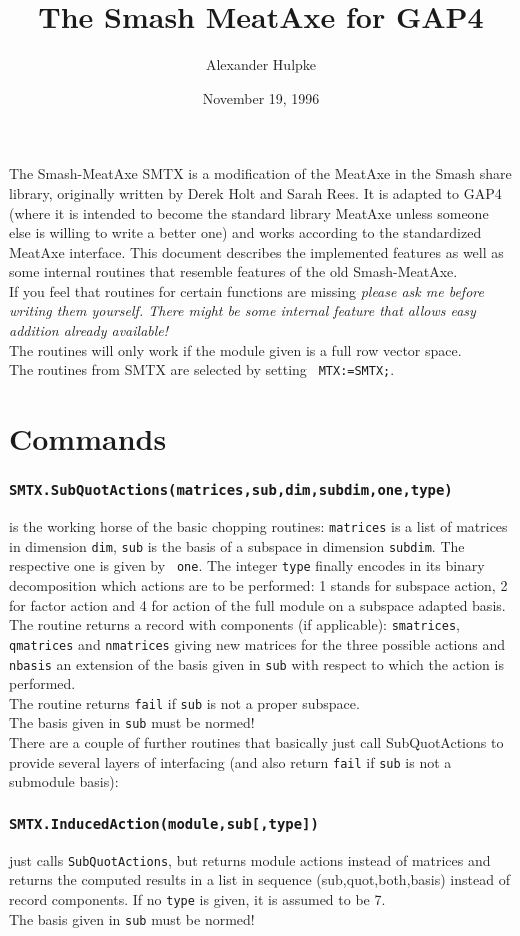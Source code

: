 \documentclass[12pt]{article}
\title{The Smash MeatAxe for {\sf GAP4}}
\author{Alexander Hulpke}
\date{November 19, 1996}
\def\smtxcmd#1{\subsubsection*{{\tt #1}}}
\def\SMTX{{\sf SMTX}}
\begin{document}
\maketitle
The {\sf Smash}-MeatAxe {\SMTX} is a modification of the MeatAxe in the {\sf
Smash} share library, originally written by Derek Holt and Sarah Rees. It is
adapted to {\sf GAP4}
(where it is intended to become the standard library MeatAxe
unless someone else is willing to write a better one) and works according to
the standardized MeatAxe interface. This document describes the implemented
features as well as some internal routines that resemble features of the
old {\sf Smash}-MeatAxe.\\
If you feel that routines for certain functions are missing {\em please ask
me before writing them yourself. There might be some internal feature that
allows easy addition already available!}\\
The routines will only work if the module given is a full row vector space.\\
The routines from {\SMTX} are selected by setting {\verb+ MTX:=SMTX;+}.

\section*{Commands}
\smtxcmd{SMTX.SubQuotActions(matrices,sub,dim,subdim,one,type)}
is the working horse of the basic chopping routines: {\tt matrices} is a
list of matrices in dimension {\tt dim}, {\tt sub} is the basis of a
subspace in dimension {\tt subdim}. The respective one is given by {\tt
one}. The integer {\tt type} finally encodes in its binary decomposition
which actions are to be performed: 1 stands for subspace action, 2 for
factor action and 4 for action of the full module
on a subspace adapted basis. The routine
returns a record with components (if applicable): {\tt smatrices}, {\tt
qmatrices} and {\tt nmatrices} giving new matrices for the three possible
actions and {\tt nbasis} an extension of the basis given in {\tt sub} with
respect to which the action is performed.\\
The routine returns {\tt fail} if {\tt sub} is not a proper subspace.\\
The basis given in {\tt sub} must be normed!\\
There are a couple of further routines that basically just call
SubQuotActions to provide several layers of interfacing (and also return
{\tt fail} if {\tt sub} is not a submodule basis):

\smtxcmd{SMTX.InducedAction(module,sub[,type])}
just calls {\tt SubQuotActions}, but returns module actions instead of
matrices and returns the computed results in a list in sequence
(sub,quot,both,basis) instead of record components. If no {\tt type} is
given, it is assumed to be 7.\\
The basis given in {\tt sub} must be normed!
\end{document}
